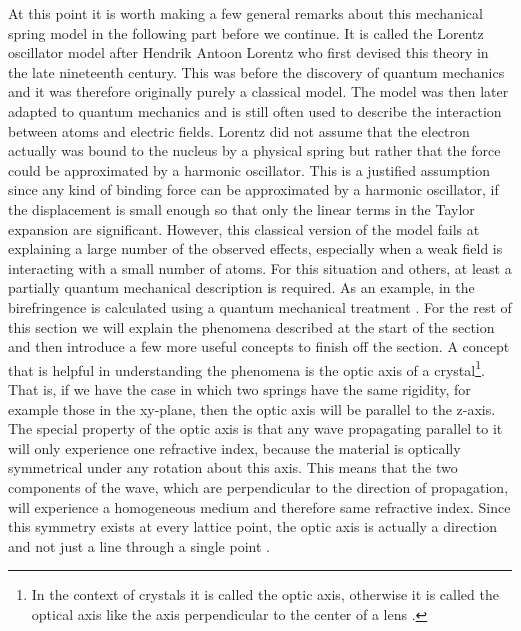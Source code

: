 At this point it is worth making a few general remarks about this mechanical spring model in the following part before we continue. It is called the Lorentz oscillator model after Hendrik Antoon Lorentz who first devised this theory in the late nineteenth century. This was before the discovery of quantum mechanics and it was therefore originally purely a classical model. The model was then later adapted to quantum mechanics and is still often used to describe the interaction between atoms and electric fields. Lorentz did not assume that the electron actually was bound to the nucleus by a physical spring but rather that the force could be approximated by a harmonic oscillator. This is a justified assumption since any kind of binding force can be approximated by a harmonic oscillator, if the displacement is small enough so that only the linear terms in the Taylor expansion are significant. However, this classical version of the model fails at explaining a large number of the observed effects, especially when a weak field is interacting with a small number of atoms. For this situation and others, at least a partially quantum mechanical description is required. As an example, in \cite{Rerat2020} the birefringence is calculated using a quantum mechanical treatment \cite{doi:https://doi.org/10.1002/9780470409718.ch3}. For the rest of this section we will explain the phenomena described at the start of the section and then introduce a few more useful concepts to finish off the section. A concept that is helpful in understanding the phenomena is the optic axis of a crystal\footnote{In the context of crystals it is called the optic axis, otherwise it is called the optical axis like the axis perpendicular to the center of a lens \cite{Hecht}.}. That is, if we have the case in which two springs have the same rigidity, for example those in the xy-plane, then the optic axis will be parallel to the z-axis. The special property of the optic axis is that any wave propagating parallel to it will only experience one refractive index, because the material is optically symmetrical under any rotation about this axis. This means that the two components of the wave, which are perpendicular to the direction of propagation, will experience a homogeneous medium and therefore same refractive index. Since this symmetry exists at every lattice point, the optic axis is actually a direction and not just a line through a single point \cite{Hecht}. 


